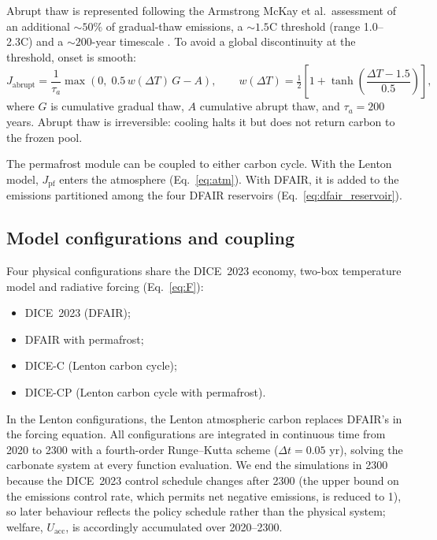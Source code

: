 Abrupt thaw is represented following the Armstrong McKay et al.\ assessment of an additional ${\sim}50\%$ of gradual-thaw emissions, a ${\sim}1.5$\textdegree C threshold (range 1.0--2.3\textdegree C) and a ${\sim}200$-year timescale \citep{armstrongmckayExceeding15degCGlobal2022}. To avoid a global discontinuity at the threshold, onset is smooth:
\begin{equation}
J_{\text{abrupt}} = \frac{1}{\tau_a}\max\!\left(0,\; 0.5\, w(\Delta T)\, G - A\right), \qquad
w(\Delta T) = \tfrac{1}{2}\left[1 + \tanh\!\left(\frac{\Delta T - 1.5}{0.5}\right)\right],
\label{eq:abruptthaw}
\end{equation}
where $G$ is cumulative gradual thaw, $A$ cumulative abrupt thaw, and $\tau_a = 200$ years. Abrupt thaw is irreversible: cooling halts it but does not return carbon to the frozen pool.

The permafrost module can be coupled to either carbon cycle. With the Lenton model, $J_{\text{pf}}$ enters the atmosphere (Eq.~\ref{eq:atm}). With DFAIR, it is added to the emissions partitioned among the four DFAIR reservoirs (Eq.~\ref{eq:dfair_reservoir}).

\subsection{Model configurations and coupling}
Four physical configurations share the DICE~2023 economy, two-box temperature model and radiative forcing (Eq.~\ref{eq:F}):
\begin{itemize}
\item DICE~2023 (DFAIR);
\item DFAIR with permafrost;
\item DICE-C (Lenton carbon cycle);
\item DICE-CP (Lenton carbon cycle with permafrost).
\end{itemize}
In the Lenton configurations, the Lenton atmospheric carbon replaces DFAIR's in the forcing equation. All configurations are integrated in continuous time from 2020 to 2300 with a fourth-order Runge--Kutta scheme ($\Delta t = 0.05$ yr), solving the carbonate system at every function evaluation. We end the simulations in 2300 because the DICE~2023 control schedule changes after 2300 (the upper bound on the emissions control rate, which permits net negative emissions, is reduced to 1), so later behaviour reflects the policy schedule rather than the physical system; welfare, $U_{\text{acc}}$, is accordingly accumulated over 2020--2300.


